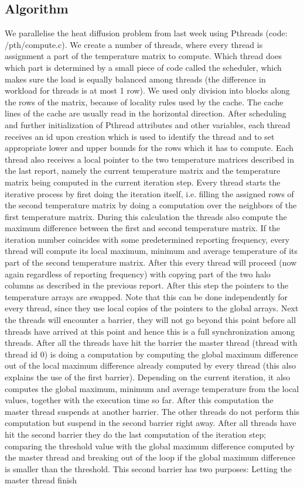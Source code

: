 \documentclass[11pt,a4paper,onecolumn]{article}
\begin{document}
\subsection{Algorithm}
We parallelise the heat diffusion problem from last week using Pthreads (code: /pth/compute.c). We create a number of threads, where every thread is assignment a part of the temperature matrix to compute. Which thread does which part is determined by a small piece of code called the scheduler, which makes sure the load is equally balanced among threads (the difference in workload for threads is at most 1 row). We used only division into blocks along the rows of the matrix, because of locality rules used by the cache. The cache lines of the cache are usually read in the horizontal direction. After scheduling and further initialization of Pthread attributes and other variables, each thread receives an id upon creation which is used to identify the thread and to set appropriate lower and upper bounds for the rows which it has to compute. Each thread also receives a local pointer to the two temperature matrices described in the last report, namely the current temperature matrix and the temperature matrix being computed in the current iteration step. Every thread starts the iterative process by first doing the iteration itself, i.e. filling the assigned rows of the second temperature matrix by doing a computation over the neighbors of the first temperature matrix. During this calculation the threads also compute the maximum difference between the first and second temperature matrix. If the iteration number coincides with some predetermined reporting frequency, every thread will compute its local maximum, minimum and average temperature of its part of the second temperature matrix. After this every thread will proceed (now again regardless of reporting frequency) with copying part of the two halo columns as described in the previous report. After this step the pointers to the temperature arrays are swapped. Note that this can be done independently for every thread, since they use local copies of the pointers to the global arrays. Next the threads will encounter a barrier, they will not go beyond this point before all threads have arrived at this point and hence this is a full synchronization among threads. After all the threads have hit the barrier the master thread (thread with thread id 0) is doing a computation by computing the global maximum difference out of the local maximum difference already computed by every thread (this also explains the use of the first barrier). Depending on the current iteration, it also computes the global maximum, minimum and average temperature from the local values, together with the execution time so far. After this computation the master thread suspends at another barrier. The other threads do not perform this computation but suspend in the second barrier right away. After all threads have hit the second barrier they do the last computation of the iteration step; comparing the threshold value with the global maximum difference computed by the master thread and breaking out of the loop if the global maximum difference is smaller than the threshold. This second barrier has two purposes: Letting the master thread finish 
\end{document}
